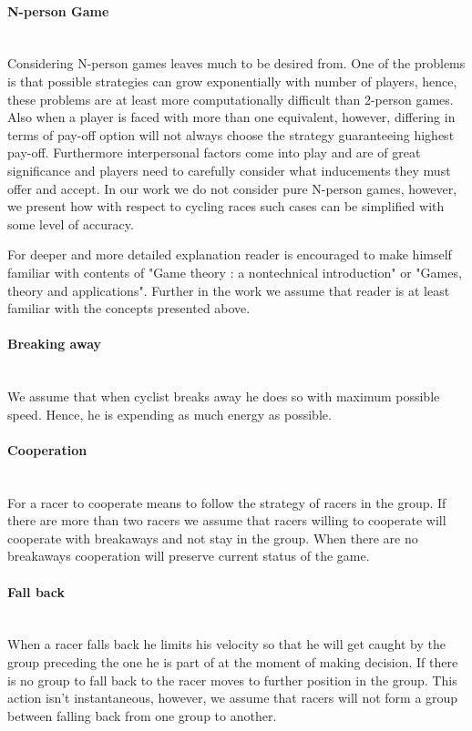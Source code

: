 \documentclass[10pt, a4paper]{report}
\begin{document}
\paragraph{N-person Game} ~\\
Considering N-person games leaves much to be desired from. One of the problems is that possible strategies can grow exponentially with number of players, hence, these problems are at least more computationally difficult than 2-person games. Also when a player is faced with more than one equivalent, however, differing in terms of pay-off option will not always choose the strategy guaranteeing highest pay-off. Furthermore interpersonal factors come into play and are of great significance and players need to carefully consider what inducements they must offer and accept. In our work we do not consider pure N-person games, however, we present how with respect to cycling races such cases can be simplified with some level of accuracy.

For deeper and more detailed explanation reader is encouraged to make himself familiar with contents of "Game theory : a nontechnical introduction"\cite{GameTheoryNonTechnical} or "Games, theory and applications"\cite{GameTheoryApplications}. Further in the work we assume that reader is at least familiar with the concepts presented above.

\paragraph{Breaking away} ~\\
We assume that when cyclist breaks away he does so with maximum possible speed. Hence, he is expending as much energy as possible.

\paragraph{Cooperation} ~\\
For a racer to cooperate means to follow the strategy of racers in the group. If there are more than two racers we assume that racers willing to cooperate will cooperate with breakaways and not stay in the group. When there are no breakaways cooperation will preserve current status of the game.

\paragraph{Fall back} ~\\
When a racer falls back he limits his velocity so that he will get caught by the group preceding the one he is part of at the moment of making decision. If there is no group to fall back to the racer moves to further position in the group. This action isn't instantaneous, however, we assume that racers will not form a group between falling back from one group to another.
\end{document}
